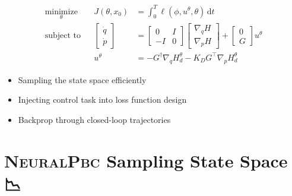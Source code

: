 \documentclass[
]{report}
\providecommand{\tightlist}{%
  \setlength{\itemsep}{0pt}\setlength{\parskip}{0pt}}\usepackage{longtable,booktabs,array}
\begin{document}
\begin{tcolorbox}[enhanced jigsaw, opacityback=0, breakable, leftrule=.75mm, toptitle=1mm, rightrule=.15mm, toprule=.15mm, bottomrule=.15mm, opacitybacktitle=0.6, colbacktitle=quarto-callout-note-color!10!white, colframe=quarto-callout-note-color-frame, title={Data-Driven Passivity-based control}, bottomtitle=1mm, left=2mm, colback=white, arc=.35mm, titlerule=0mm, coltitle=black]
\[
\begin{aligned}
\underset{\theta}{\text{minimize}} && J(\theta, x_0) &= \int_{0}^{T} \ell \left(\phi,u^\theta,\theta\right)\, \text{d} t \\
\text{subject to} &&
\begin{bmatrix}
  \dot{q} \\ \dot{p}
\end{bmatrix} &=
\begin{bmatrix}
  0 & I \\ -I & 0
\end{bmatrix}
\begin{bmatrix} \nabla_q H \\ \nabla_p H \end{bmatrix} + 
\begin{bmatrix}
  0 \\ G
\end{bmatrix} u^{\theta}
\\
&& u^\theta &= -G^{\dagger} \nabla_q H_d^{\theta}  - K_D G^\top \nabla_p H_d^{\theta}
\end{aligned}
\]
\end{tcolorbox}

\begin{itemize}
\tightlist
\item
  Sampling the state space efficiently
\item
  Injecting control task into loss function design
\item
  Backprop through closed-loop trajectories
\end{itemize}

\hypertarget{neuralpbc-sampling-state-space}{%
\section{\texorpdfstring{\textsc{NeuralPbc} Sampling State Space
{📉}}{NeuralPbc Sampling State Space 📉}}\label{neuralpbc-sampling-state-space}}
\end{document}
